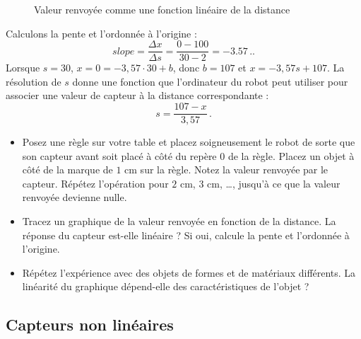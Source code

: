 \begin{figure}
\begin{center}
\caption{Valeur renvoyée comme une fonction linéaire de la distance}\label{fig.linear}
\end{center}
\end{figure}

Calculons la pente et l'ordonnée à l'origine :
\[
\mathit{slope} = \frac{\Delta x}{\Delta s} = \frac{0-100}{30-2}=-3.57\,..
\]
Lorsque $s=30$, $x=0=-3,57\cdot 30+b$, donc $b=107$ et $x = -3,57 s + 107$. La résolution de $s$ donne une fonction que l'ordinateur du robot peut utiliser pour associer une valeur de capteur à la distance correspondante :
\[
s = \frac{107-x}{3,57}\,.
\]

\begin{framed}
\begin{itemize}
\item Posez une règle sur votre table et placez soigneusement le robot de sorte que son
capteur avant soit placé à côté du repère $0$ de la règle. Placez un objet à côté de la marque de $1$ cm sur la règle. Notez la valeur renvoyée par le capteur. Répétez l'opération pour $2$ cm, $3$ cm, \ldots, jusqu'à ce que la valeur renvoyée devienne nulle.
\item Tracez un graphique de la valeur renvoyée en fonction de la distance. La réponse du capteur est-elle linéaire ? Si oui, calcule la pente et l'ordonnée à l'origine.
\item Répétez l'expérience avec des objets de formes et de matériaux différents. La linéarité du graphique dépend-elle des caractéristiques de l'objet ?
\end{itemize}
\end{framed}

\subsection{Capteurs non linéaires}

